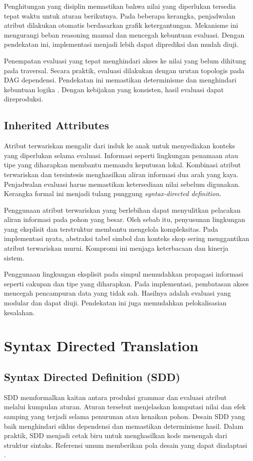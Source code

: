 \documentclass[../main.tex]{subfiles}
\begin{document}
Penghitungan yang disiplin memastikan bahwa nilai yang diperlukan tersedia tepat waktu untuk aturan berikutnya. Pada beberapa kerangka, penjadwalan atribut dilakukan otomatis berdasarkan grafik ketergantungan. Mekanisme ini mengurangi beban reasoning manual dan mencegah kebuntuan evaluasi. Dengan pendekatan ini, implementasi menjadi lebih dapat diprediksi dan mudah diuji.

Penempatan evaluasi yang tepat menghindari akses ke nilai yang belum dihitung pada traversal. Secara praktik, evaluasi dilakukan dengan urutan topologis pada DAG dependensi. Pendekatan ini memastikan determinisme dan menghindari kebuntuan logika \citep{WikiAttributeGrammar}. Dengan kebijakan yang konsisten, hasil evaluasi dapat direproduksi.

\subsection{Inherited Attributes}
Atribut terwariskan mengalir dari induk ke anak untuk menyediakan konteks yang diperlukan selama evaluasi. Informasi seperti lingkungan penamaan atau tipe yang diharapkan membantu memandu keputusan lokal. Kombinasi atribut terwariskan dan tersintesis menghasilkan aliran informasi dua arah yang kaya. Penjadwalan evaluasi harus memastikan ketersediaan nilai sebelum digunakan. Kerangka formal ini menjadi tulang punggung \emph{syntax-directed definition}.

Penggunaan atribut terwariskan yang berlebihan dapat menyulitkan pelacakan aliran informasi pada pohon yang besar. Oleh sebab itu, penyusunan lingkungan yang eksplisit dan terstruktur membantu mengelola kompleksitas. Pada implementasi nyata, abstraksi tabel simbol dan konteks skop sering menggantikan atribut terwariskan murni. Kompromi ini menjaga keterbacaan dan kinerja sistem.

Penggunaan lingkungan eksplisit pada simpul memudahkan propagasi informasi seperti cakupan dan tipe yang diharapkan. Pada implementasi, pembatasan akses mencegah pencampuran data yang tidak sah. Hasilnya adalah evaluasi yang modular dan dapat diuji. Pendekatan ini juga memudahkan pelokalisasian kesalahan.

\section{Syntax Directed Translation}
\subsection{Syntax Directed Definition (SDD)}
SDD memformalkan kaitan antara produksi grammar dan evaluasi atribut melalui kumpulan aturan. Aturan tersebut menjelaskan komputasi nilai dan efek samping yang terjadi selama penurunan atau kenaikan pohon. Desain SDD yang baik menghindari siklus dependensi dan memastikan determinisme hasil. Dalam praktik, SDD menjadi cetak biru untuk menghasilkan kode menengah dari struktur sintaks. Referensi umum memberikan pola desain yang dapat diadaptasi \citep{WikiSDT}.
\end{document}
